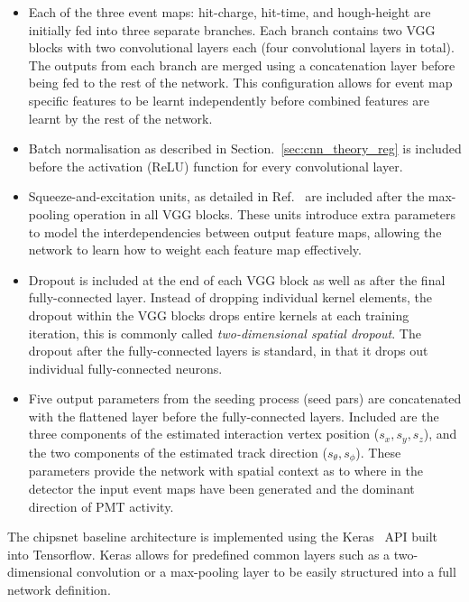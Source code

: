 \begin{itemize}
    \item Each of the three event maps: hit-charge, hit-time, and hough-height are initially fed
          into three separate branches. Each branch contains two VGG blocks with two convolutional
          layers each (four convolutional layers in total). The outputs from each branch are
          merged using a concatenation layer before being fed to the rest of the network. This
          configuration allows for event map specific features to be learnt independently before
          combined features are learnt by the rest of the network.

    \item Batch normalisation as described in Section.~\ref{sec:cnn_theory_reg} is included before
          the activation (ReLU) function for every convolutional layer.

    \item Squeeze-and-excitation units, as detailed in Ref.~\cite{hu2018} are included after the
          max-pooling operation in all VGG blocks. These units introduce extra parameters to model
          the interdependencies between output feature maps, allowing the network to learn how to
          weight each feature map effectively.

    \item Dropout is included at the end of each VGG block as well as after the final
          fully-connected layer. Instead of dropping individual kernel elements, the dropout
          within the VGG blocks drops entire kernels at each training iteration, this is commonly
          called \emph{two-dimensional spatial dropout}. The dropout after the fully-connected
          layers is standard, in that it drops out individual fully-connected neurons.

    \item Five output parameters from the seeding process (seed pars) are concatenated with the
          flattened layer before the fully-connected layers. Included are the three components of
          the estimated interaction vertex position ($s_{x},s_{y}, s_{z}$), and the two components
          of the estimated track direction ($s_{\theta},s_{\phi}$). These parameters provide the
          network with spatial context as to where in the detector the input event maps have been
          generated and the dominant direction of PMT activity.
\end{itemize}

The chipsnet baseline architecture is implemented using the Keras~\cite{chollet2015} API built
into Tensorflow. Keras allows for predefined common layers such as a two-dimensional convolution
or a max-pooling layer to be easily structured into a full network definition.


